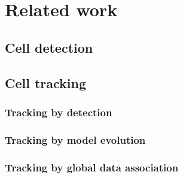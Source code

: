 \chapter{Related work }
\label{chap:relatedwork}
	\section{Cell detection }
	\section{Cell tracking }
		\subsection{Tracking by detection }
		\subsection{Tracking by model evolution }
		\subsection{Tracking by global data association }